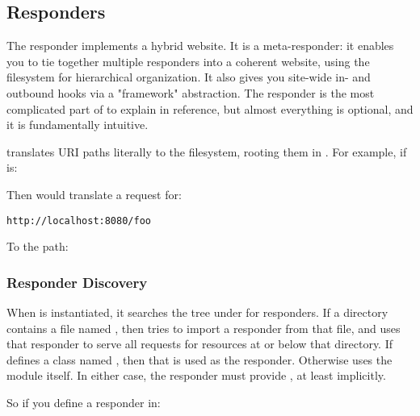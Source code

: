 \subsection{ Responders \label{multiple}}

The  responder implements a hybrid website. It is a
meta-responder: it enables you to tie together multiple responders into a
coherent website, using the filesystem for hierarchical organization. It also
gives you site-wide in- and outbound hooks via a "framework" abstraction. The
 responder is the most complicated part of  to
explain in reference, but almost everything is optional, and it is fundamentally
intuitive.

 translates URI paths literally to the filesystem, rooting them
in . For example, if  is:

\begin{quote}
\end{quote}

Then  would translate a request for:

\begin{verbatim}
http://localhost:8080/foo
\end{verbatim}

To the path:

\begin{quote}
\end{quote}


\subsubsection{Responder Discovery}

When  is instantiated, it searches the tree under  for
responders. If a directory contains a file named , then
 tries to import a responder from that file, and uses that
responder to serve all requests for resources at or below that directory. If
 defines a class named , then that is used
as the responder. Otherwise  uses the module itself. In either
case, the responder must provide , at least implicitly.

So if you define a responder in:

\begin{quote}
\end{quote}

